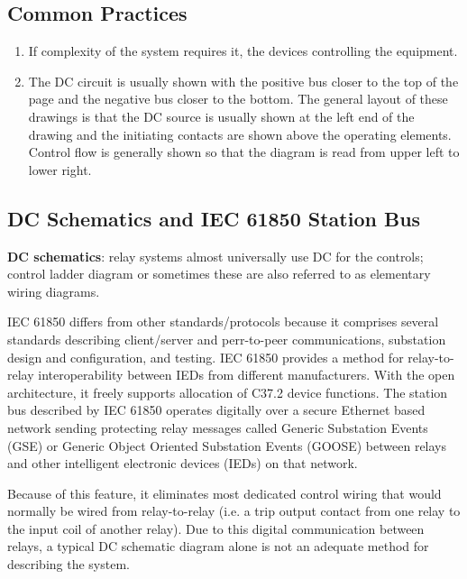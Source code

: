 \subsection{Common Practices}
\begin{enumerate}
    \item If complexity of the system requires it, the devices controlling the equipment.
    \item The DC circuit is usually shown with the positive bus closer to the top of the page and the negative bus closer to the bottom. 
    The general layout of these drawings is that the DC source is usually shown at the left end of the drawing and the initiating contacts are shown above the operating elements. 
    Control flow is generally shown so that the diagram is read from upper left to lower right.
\end{enumerate}

\subsection{DC Schematics and IEC 61850 Station Bus}
\textbf{DC schematics}: relay systems almost universally use DC for the controls; control ladder diagram or sometimes these are also referred to as elementary wiring diagrams.

IEC 61850 differs from other standards/protocols because it comprises several standards describing client/server and perr-to-peer communications, substation design and configuration, and testing. IEC 61850 provides a method for relay-to-relay interoperability between IEDs from different manufacturers. With the open architecture, it freely supports allocation of C37.2 device functions. The station bus described by IEC 61850 operates digitally over a secure Ethernet based network sending protecting relay messages called Generic Substation Events (GSE) or Generic Object Oriented Substation Events (GOOSE) between relays and other intelligent electronic devices (IEDs) on that network.

Because of this feature, it eliminates most dedicated control wiring that would normally be wired from relay-to-relay (i.e. a trip output contact from one relay to the input coil of another relay). Due to this digital communication between relays, a typical DC schematic diagram alone is not an adequate method for describing the system.

